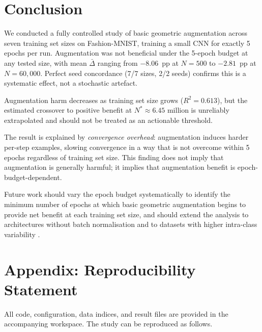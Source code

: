 \documentclass[11pt]{article}
\begin{document}
\section{Conclusion}
\label{sec:conclusion}

We conducted a fully controlled study of basic geometric augmentation across
seven training set sizes on Fashion-MNIST, training a small CNN for exactly
5 epochs per run.
Augmentation was not beneficial under the 5-epoch budget at any tested size,
with mean $\bar\Delta$ ranging from $-8.06$~pp at $N{=}500$ to $-2.81$~pp at
$N{=}60{,}000$.
Perfect seed concordance (7/7 sizes, 2/2 seeds) confirms this is a systematic
effect, not a stochastic artefact.

Augmentation harm decreases as training set size grows ($R^2{=}0.613$), but the
estimated crossover to positive benefit at $N^\ast \approx 6.45$ million is
unreliably extrapolated and should not be treated as an actionable threshold.

The result is explained by \emph{convergence overhead}: augmentation induces
harder per-step examples, slowing convergence in a way that is not overcome
within 5 epochs regardless of training set size.
This finding does not imply that augmentation is generally harmful; it implies
that augmentation benefit is epoch-budget-dependent.

Future work should vary the epoch budget systematically to identify the minimum
number of epochs at which basic geometric augmentation begins to provide net
benefit at each training set size, and should extend the analysis to
architectures without batch normalisation and to datasets with higher intra-class
variability \citep{karada2020empirical,kang2024game,mukhamediev2024state}.

\appendix
\section*{Appendix: Reproducibility Statement}
\label{app:repro}

All code, configuration, data indices, and result files are provided in the
accompanying workspace.
The study can be reproduced as follows.
\end{document}
